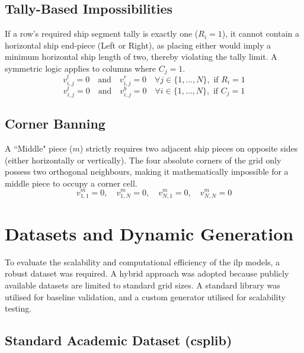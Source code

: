 \subsection{Tally-Based Impossibilities}\label{subsec:tally-based-impossibilities}
If a row's required ship segment tally is exactly one ($R_i = 1$), it cannot contain a horizontal ship end-piece (Left or Right), as placing either would imply a minimum horizontal ship length of two, thereby violating the tally limit. A symmetric logic applies to columns where $C_j = 1$.
\begin{equation}
    v_{i,j}^l = 0 \quad \text{and} \quad v_{i,j}^r = 0 \quad \forall j \in \{1, \dots, N\}, \text{ if } R_i = 1
\end{equation}
\begin{equation}
    v_{i,j}^t = 0 \quad \text{and} \quad v_{i,j}^b = 0 \quad \forall i \in \{1, \dots, N\}, \text{ if } C_j = 1
\end{equation}

\subsection{Corner Banning}\label{subsec:corner-banning}
A ``Middle" piece ($m$) strictly requires two adjacent ship pieces on opposite sides (either horizontally or vertically). The four absolute corners of the grid only possess two orthogonal neighbours, making it mathematically impossible for a middle piece to occupy a corner cell.
\begin{equation}\label{eq:vi-corner-banning}
    v_{1,1}^m = 0, \quad v_{1,N}^m = 0, \quad v_{N,1}^m = 0, \quad v_{N,N}^m = 0
\end{equation}

\section{Datasets and Dynamic Generation}\label{sec:datasets-dynamic-gen}

To evaluate the scalability and computational efficiency of the \gls{ilp} models, a robust dataset was required. A hybrid approach was adopted because publicly available datasets are limited to standard grid sizes. A standard library was utilised for baseline validation, and a custom generator utilised for scalability testing.

\subsection[Standard Academic Dataset (CSPLib)]{Standard Academic Dataset (\gls{csplib})}\label{subsec:standard-academic-dataset}


